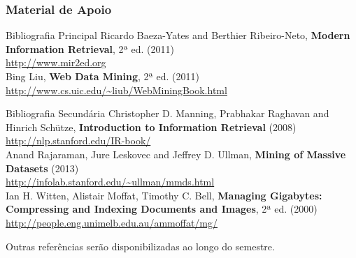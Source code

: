 \documentclass{beamer}
\begin{document}
\begin{frame}
    \frametitle{Material de Apoio}
    \begin{block}{Bibliografia Principal}
        \scriptsize 
        Ricardo Baeza-Yates and Berthier Ribeiro-Neto, \textbf{Modern Information Retrieval}, 2ª ed. (2011)\\
        {\tiny\url{http://www.mir2ed.org}}\\[.5\baselineskip]

        Bing Liu, \textbf{Web Data Mining}, 2ª ed. (2011)\\
        {\tiny\url{http://www.cs.uic.edu/~liub/WebMiningBook.html}}
    \end{block}
    \begin{block}{Bibliografia Secundária}
        \scriptsize 
        Christopher D.  Manning, Prabhakar Raghavan and Hinrich Schütze,
        \textbf{Introduction to Information Retrieval} (2008)\\
        {\tiny\url{http://nlp.stanford.edu/IR-book/}}\\[.5\baselineskip]

        Anand Rajaraman, Jure Leskovec and Jeffrey D. Ullman, \textbf{Mining of Massive Datasets} (2013)\\
        {\tiny\url{http://infolab.stanford.edu/~ullman/mmds.html}}\\[.5\baselineskip]

        Ian H. Witten, Alistair Moffat, Timothy C. Bell, \textbf{Managing Gigabytes: Compressing and Indexing Documents and Images}, 2ª ed. (2000)\\
        {\tiny\url{http://people.eng.unimelb.edu.au/ammoffat/mg/}}
    \end{block}
    Outras referências serão disponibilizadas ao longo do semestre.
\end{frame}
\end{document}
